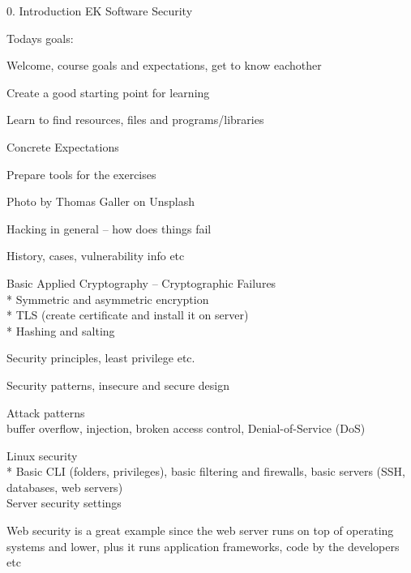 \documentclass[Screen16to9,17pt]{foils}
\begin{document}
\mytitlepage
{0. Introduction}
{EK Software Security}

\hlkprofiluk



Todays goals:
\begin{list2}
\item Welcome, course goals and expectations, get to know eachother
\item Create a good starting point for learning
\item Learn to find resources, files and programs/libraries
\item Concrete Expectations
\item Prepare tools for the exercises
\end{list2}

  Photo by Thomas Galler on Unsplash


\begin{list2}
\item Hacking in general -- how does things fail
\item History, cases, vulnerability info etc
\item Basic Applied Cryptography -- Cryptographic Failures\\
  * Symmetric and asymmetric encryption\\
  * TLS (create certificate and install it on server)\\
  * Hashing and salting
\item Security principles, least privilege etc.
\item Security patterns, insecure and secure design
\end{list2}

\begin{list2}
\item Attack patterns\\
buffer overflow, injection, broken access control, Denial-of-Service (DoS)
\item Linux security\\
* Basic CLI (folders, privileges), basic filtering and firewalls, basic servers (SSH, databases, web servers)\\
Server security settings
\end{list2}

Web security is a great example since the web server runs on top of operating systems and lower, plus it runs application frameworks, code by the developers etc
\end{document}
